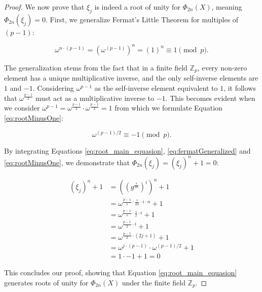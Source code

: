 \begin{proof}
We now prove that $\xi_j$ is indeed a root of unity for $\Phi_{2n}(X)$, meaning $\Phi_{2n}(\xi_j)=0$. First, we generalize Fermat's Little Theorem for multiples of $(p-1)$:

\begin{equation}
\label{eq:fermatGeneralized}
\omega^{n\cdot(p-1)} = \left(\omega^{(p-1)}\right)^n = \left(1\right)^n \equiv 1 \pmod{p}.
\end{equation}

The generalization stems from the fact that in a finite field $\mathbb{Z}_p$, every non-zero element has a unique multiplicative inverse, and the only self-inverse elements are $1$ and $-1$. Considering $\omega^{p-1}$ as the self-inverse element equivalent to $1$, it follows that $\omega^{\frac{p-1}{2}}$ must act as a multiplicative inverse to $-1$. This becomes evident when we consider $\omega^{p-1} = \omega^{\frac{p-1}{2}} \cdot \omega^{\frac{p-1}{2}} = 1$ from which we formulate Equation \ref{eq:rootMinusOne}:

\begin{equation}
\label{eq:rootMinusOne}
\omega^{(p-1)/2} \equiv -1 \pmod{p}.
\end{equation}

By integrating Equations \ref{eq:root_main_equasion}, \ref{eq:fermatGeneralized} and \ref{eq:rootMinusOne}, we demonstrate that $\Phi_{2n}(\xi_j) = (\xi_j)^n + 1 = 0$:

\begin{equation}
\begin{aligned}
\label{eq:rootProof}
(\xi_j)^n + 1 &= \left(\left(g^{\frac{s}{2n}}\right)^i\right)^n + 1 \\
   &=\omega^{\frac{p-1}{s} \cdot  \frac{s}{2n} \cdot i \cdot n} + 1 \\
   &=\omega^{\frac{p-1}{s} \cdot \frac{s}{2} \cdot i} + 1\\
   &=\omega^{\frac{p-1}{2} \cdot i} + 1\\
   &=\omega^{\frac{p-1}{2} \cdot (2j + 1)} + 1\\
   &=\omega^{j \cdot (p-1)} \cdot \omega^{(p-1)/2} + 1\\
   &=1 \cdot -1 + 1 = 0
\end{aligned}
\end{equation}

This concludes our proof, showing that Equation \ref{eq:root_main_equasion} generates roots of unity for $\Phi_{2n}(X)$ under the finite field $\mathbb{Z}_p$. 
\end{proof}

